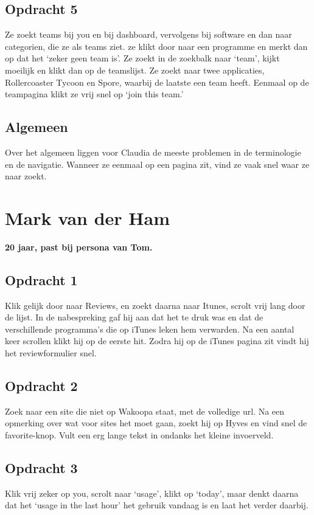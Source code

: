 \subsection{Opdracht 5}
 Ze zoekt teams bij you en bij dashboard, vervolgens bij software en dan naar categorien, die ze als teams ziet. ze klikt door naar een programme en merkt dan op dat het `zeker geen team is'. Ze zoekt in de zoekbalk naar `team', kijkt moeilijk en klikt dan op de teamslijst. Ze zoekt naar twee applicaties, Rollercoaster Tycoon en Spore, waarbij de laatste een team heeft. Eenmaal op de teampagina klikt ze vrij snel op `join this team.'

 \subsection{Algemeen}
  Over het algemeen liggen voor Claudia de meeste problemen in de terminologie en de navigatie. Wanneer ze eenmaal op een pagina zit, vind ze vaak snel waar ze naar zoekt.

\section{Mark van der Ham}
\textbf{20 jaar, past bij persona van Tom.}

\subsection{Opdracht 1}
Klik gelijk door naar Reviews, en zoekt daarna naar Itunes, scrolt vrij lang door de lijst. In de nabespreking gaf hij aan dat het te druk was en dat de verschillende programma's die op iTunes leken hem verwarden. Na een aantal keer scrollen klikt hij op de eerste hit. Zodra hij op de iTunes pagina zit vindt hij het reviewformulier snel.

\subsection{Opdracht 2}
Zoek naar een site die niet op Wakoopa staat, met de volledige url. Na een opmerking over wat voor sites het moet gaan, zoekt hij op Hyves en vind snel de favorite-knop. Vult een erg lange tekst in ondanks het kleine invoerveld.

\subsection{Opdracht 3}
Klik vrij zeker op you, scrolt naar `usage', klikt op `today', maar denkt daarna dat het `usage in the last hour' het gebruik vandaag is en laat het verder daarbij.

